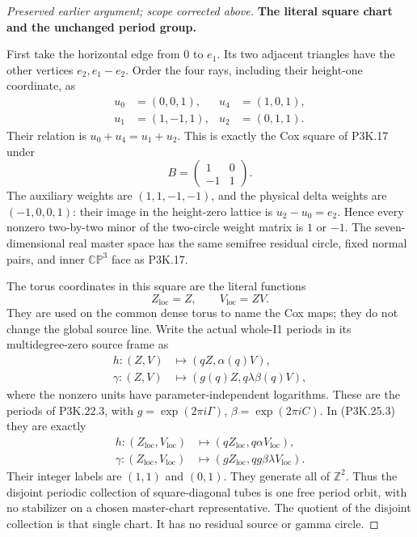 \begin{proof}[Preserved earlier argument; scope corrected above]
\par\medskip\noindent\textbf{The literal square chart and the unchanged period group.}\enspace

First take the horizontal edge from \(0\) to \(e_1\). Its two
adjacent triangles have the other vertices \(e_2,e_1-e_2\).
Order the four rays, including their height-one coordinate, as
\[
\begin{aligned}
 u_0&=(0,0,1),&u_4&=(1,0,1),\\
 u_1&=(1,-1,1),&u_2&=(0,1,1).
\end{aligned}
                                                        \tag{P3K.25.2}
\]
Their relation is \(u_0+u_4=u_1+u_2\). This is exactly the Cox
square of P3K.17 under
\[
 B=\begin{pmatrix}1&0\\-1&1\end{pmatrix}.
\]
The auxiliary weights are \((1,1,-1,-1)\), and the physical
delta weights are \((-1,0,0,1)\): their image in the height-zero
lattice is \(u_2-u_0=e_2\). Hence every nonzero two-by-two
minor of the two-circle weight matrix is \(1\) or \(-1\).
The seven-dimensional real master space has the same semifree
residual circle, fixed normal pairs, and inner \(\mathbb{CP}^3\)
face as P3K.17.

The torus coordinates in this square are the literal functions
\[
                  Z_{\mathrm{loc}}=Z,\qquad
                  V_{\mathrm{loc}}=ZV.                 \tag{P3K.25.3}
\]
They are used on the common dense torus to name the Cox maps;
they do not change the global source line. Write the actual
whole-I1 periods in its multidegree-zero source frame as
\[
\begin{aligned}
 h:(Z,V)&\longmapsto(qZ,\alpha(q)V),\\
 \gamma:(Z,V)&\longmapsto(g(q)Z,q\lambda\beta(q)V),
\end{aligned}
                                                        \tag{P3K.25.4}
\]
where the nonzero units have parameter-independent logarithms.
These are the periods of P3K.22.3, with
\(g=\exp(2\pi i\Gamma)\), \(\beta=\exp(2\pi iC)\).
In (P3K.25.3) they are exactly
\[
\begin{aligned}
 h:(Z_{\mathrm{loc}},V_{\mathrm{loc}})
       &\longmapsto(qZ_{\mathrm{loc}},q\alpha V_{\mathrm{loc}}),\\
 \gamma:(Z_{\mathrm{loc}},V_{\mathrm{loc}})
       &\longmapsto(gZ_{\mathrm{loc}},
                          qg\beta\lambda V_{\mathrm{loc}}).
\end{aligned}
                                                        \tag{P3K.25.5}
\]
Their integer labels are \((1,1)\) and \((0,1)\).
They generate all of \(\mathbb Z^2\). Thus the disjoint periodic
collection of square-diagonal tubes is one free period orbit,
with no stabilizer on a chosen master-chart representative.
The quotient of the disjoint collection is that single chart.
It has no residual source or gamma circle.


\end{proof}
